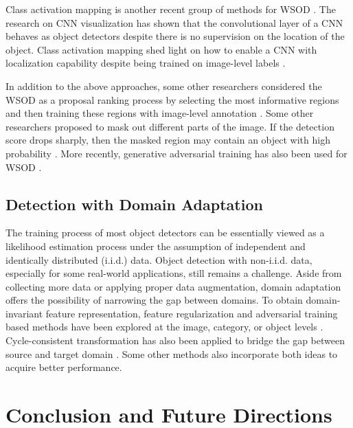 \documentclass[lettersize,journal]{IEEEtran}
\begin{document}
Class activation mapping is another recent group of methods for WSOD \cite{ICCV17-SoftWeakly, CVPR17-WeaklyCascade}. The research on CNN visualization has shown that the convolutional layer of a CNN behaves as object detectors despite there is no supervision on the location of the object. Class activation mapping shed light on how to enable a CNN with localization capability despite being trained on image-level labels \cite{CVPR16-GlobalPool}.

In addition to the above approaches, some other researchers considered the WSOD as a proposal ranking process by selecting the most informative regions and then training these regions with image-level annotation \cite{CVPR16-WeaklySort}. Some other researchers proposed to mask out different parts of the image. If the detection score drops sharply, then the masked region may contain an object with high probability \cite{WACV16-SelfTaught}. More recently, generative adversarial training has also been used for WSOD \cite{CVPR18-GALWeakly}.

\subsection{Detection with Domain Adaptation}\label{subsec:domain}

The training process of most object detectors can be essentially viewed as a likelihood estimation process under the assumption of independent and identically distributed (i.i.d.) data. Object detection with non-i.i.d. data, especially for some real-world applications, still remains a challenge. Aside from collecting more data or applying proper data augmentation, domain adaptation offers the possibility of narrowing the gap between domains. To obtain domain-invariant feature representation, feature regularization and adversarial training based methods have been explored at the image, category, or object levels \cite{chen2018domain, wang2021domain, hou2021informative, zhu2019adapting, saito2019strong, xu2020exploring}. Cycle-consistent transformation \cite{zhu2017unpaired} has also been applied to bridge the gap between source and target domain \cite{kim2019diversify, inoue2018cross}. Some other methods also incorporate both ideas \cite{hsu2020progressive} to acquire better performance. 


\section{Conclusion and Future Directions}\label{sec:conclusion}
\end{document}
